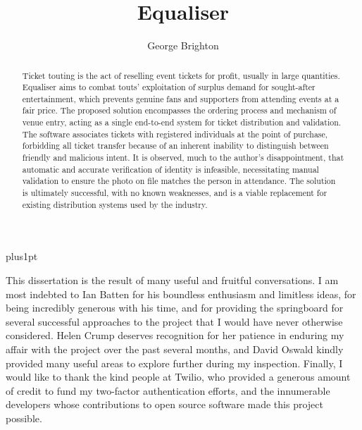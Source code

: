 \documentclass[12pt,a4paper]{bhamdissertation}
\title{Equaliser}
\author{George Brighton}
\begin{document}
\baselineskip=18pt plus1pt

\setcounter{secnumdepth}{1}
\setcounter{tocdepth}{1}

\maketitle

\begin{romanpages}

\tableofcontents

\cleardoublepage{}
\begin{abstract}
Ticket touting is the act of reselling event tickets for profit, usually in large quantities. Equaliser aims to combat touts' exploitation of surplus demand for sought-after entertainment, which prevents genuine fans and supporters from attending events at a fair price. The proposed solution encompasses the ordering process and mechanism of venue entry, acting as a single end-to-end system for ticket distribution and validation. The software associates tickets with registered individuals at the point of purchase, forbidding all ticket transfer because of an inherent inability to distinguish between friendly and malicious intent. It is observed, much to the author's disappointment, that automatic and accurate verification of identity is infeasible, necessitating manual validation to ensure the photo on file matches the person in attendance. The solution is ultimately successful, with no known weaknesses, and is a viable replacement for existing distribution systems used by the industry.
\end{abstract}

\cleardoublepage{}
\begin{acknowledgements}
This dissertation is the result of many useful and fruitful conversations. I am most indebted to Ian Batten for his boundless enthusiasm and limitless ideas, for being incredibly generous with his time, and for providing the springboard for several successful approaches to the project that I would have never otherwise considered. Helen Crump deserves recognition for her patience in enduring my affair with the project over the past several months, and David Oswald kindly provided many useful areas to explore further during my inspection. Finally, I would like to thank the kind people at Twilio, who provided a generous amount of credit to fund my two-factor authentication efforts, and the innumerable developers whose contributions to open source software made this project possible.
\end{acknowledgements}

\end{romanpages}
\end{document}
